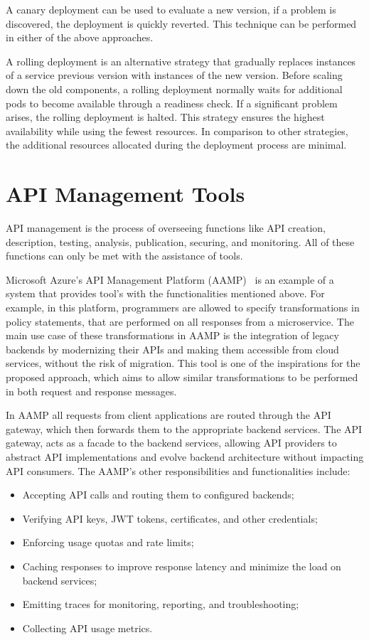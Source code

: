A canary deployment can be used to evaluate a new version, if a problem is discovered, the deployment is quickly reverted.
This technique can be performed in either of the above approaches.

A rolling deployment is an alternative strategy that gradually replaces instances of a service previous version with instances of the new version.
Before scaling down the old components, a rolling deployment normally waits for additional pods to become available through a readiness check.
If a significant problem arises, the rolling deployment is halted.
This strategy ensures the highest availability while using the fewest resources.
In comparison to other strategies, the additional resources allocated during the deployment process are minimal.

\section{API Management Tools} %
\label{sec:api_management_tools}

API management is the process of overseeing functions like API creation, description, testing, analysis, publication, securing, and monitoring.
All of these functions can only be met with the assistance of tools.

Microsoft Azure's API Management Platform (AAMP)~\cite{azureapi} is an example of a system that provides tool's with the functionalities mentioned above.
For example, in this platform, programmers are allowed to specify transformations in policy statements, that are performed on all responses from a microservice.
The main use case of these transformations in AAMP is the integration of legacy backends by modernizing their APIs and making them accessible from cloud services, without the risk of migration.
This tool is one of the inspirations for the proposed approach, which aims to allow similar transformations to be
performed in both request and response messages.

In AAMP all requests from client applications are routed through the API gateway, which then forwards them to the appropriate backend services.
The API gateway, acts as a facade to the backend services,
allowing API providers to abstract API implementations and evolve backend architecture without impacting API consumers.
The AAMP's other responsibilities and functionalities include:

\begin{itemize}
    \setlength\itemsep{0em}
    \item Accepting API calls and routing them to configured backends;
    \item Verifying API keys, JWT tokens, certificates, and other credentials;
    \item Enforcing usage quotas and rate limits;
    \item Caching responses to improve response latency and minimize the load on backend services;
    \item Emitting traces for monitoring, reporting, and troubleshooting;
    \item Collecting API usage metrics.
\end{itemize}

